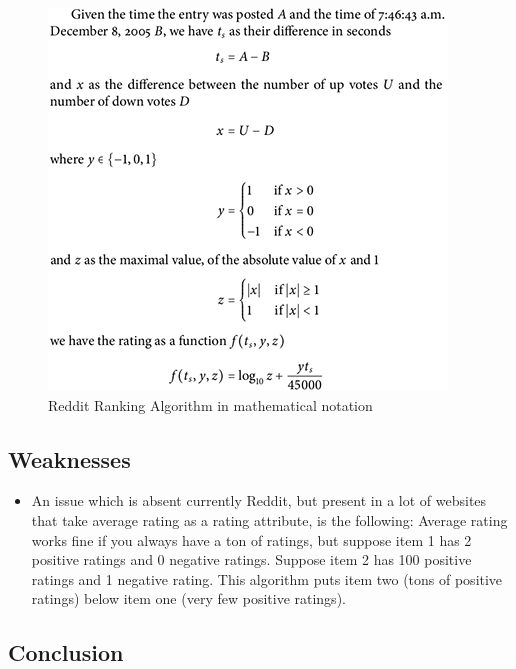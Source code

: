 \begin{figure}[h]
 \begin{center}
	 \includegraphics{Figures/reddit_rank}
 \end{center}
 \caption{Reddit Ranking Algorithm in mathematical notation}
\end{figure}

\subsection {Weaknesses}
\begin{itemize}
  \item An issue which is absent currently Reddit, but present in a lot of websites that take average rating as a rating attribute, is the following: Average rating works fine if you always have a ton of ratings, but suppose item 1 has 2 positive ratings and 0 negative ratings. Suppose item 2 has 100 positive ratings and 1 negative rating. This algorithm puts item two (tons of positive ratings) below item one (very few positive ratings).
\end{itemize}

\subsection {Conclusion}

